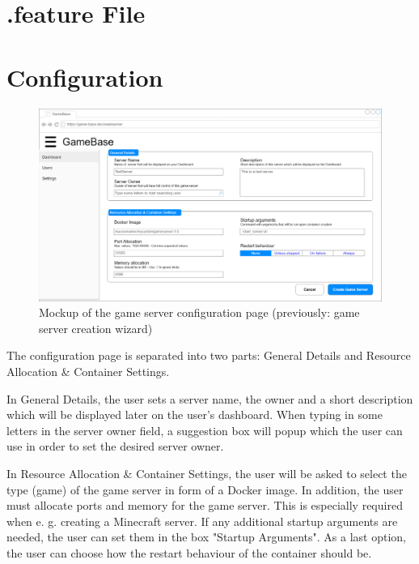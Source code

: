\documentclass[a4paper,12pt,chapterprefix=false,bibliography=totoc,listof=totoc,]{scrreprt}
\begin{document}
\section{.feature File}
\begin{minipage}{\textwidth}

\end{minipage}

\section{Configuration}
\begin{figure}
    \includegraphics[width=\textwidth]{diagramms/UCConfigureGameServerMockup.jpg}
    \caption{Mockup of the game server configuration page (previously: game server creation wizard)}
    \label{fig:mockup}
\end{figure}
The configuration page is separated into two parts: General Details and Resource Allocation \& Container Settings.

In General Details, the user sets a server name, the owner and a short description which will be displayed later on the user's dashboard. When typing in some letters in the server owner field, a suggestion box will popup which the user can use in order to set the desired server owner.

In Resource Allocation \& Container Settings, the user will be asked to select the type (game) of the game server in form of a Docker image. In addition, the user must allocate ports and memory for the game server. This is especially required when e. g. creating a Minecraft server. If any additional startup arguments are needed, the user can set them in the box "Startup Arguments". As a last option, the user can choose how the restart behaviour of the container should be.
\end{document}
